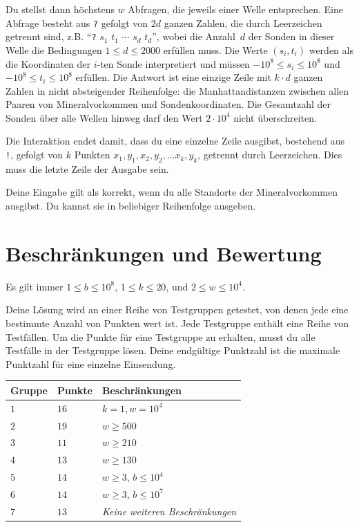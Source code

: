 Du stellst dann höchstens $w$ Abfragen, die jeweils einer Welle entsprechen.
Eine Abfrage besteht aus \texttt{?} gefolgt von $2d$ ganzen Zahlen, die durch Leerzeichen getrennt sind, z.B. ``\texttt{?} $s_1$ $t_1$ $\cdots$ $s_d$ $t_d$'', wobei die Anzahl~$d$ der Sonden in dieser Welle die Bedingungen
$1\leq d\leq 2000$ %
erfüllen muss.
Die Werte $(s_i,t_i)$ werden als die Koordinaten der $i$-ten Sonde interpretiert und müssen
$-10^8 \leq s_i \leq 10^8$ und $-10^8 \leq t_i \leq 10^8$ %
erfüllen.
Die Antwort ist eine einzige Zeile mit $k \cdot d$ ganzen Zahlen in nicht absteigender Reihenfolge: die Manhattandistanzen zwischen allen Paaren von Mineralvorkommen und Sondenkoordinaten.
Die Gesamtzahl der Sonden über alle Wellen hinweg darf den Wert
$2\cdot 10^4$ %
nicht überschreiten.

Die Interaktion endet damit, dass du eine einzelne Zeile ausgibst, bestehend aus \texttt{!}, gefolgt von $k$ Punkten $x_1, y_1, x_2, y_2, \ldots x_k, y_k$, getrennt durch Leerzeichen.
Dies muss die letzte Zeile der Ausgabe sein.

Deine Eingabe gilt als korrekt, wenn du alle Standorte der Mineralvorkommen ausgibst.
Du kannst sie in beliebiger Reihenfolge ausgeben.

\section*{Beschränkungen und Bewertung}

Es gilt immer
$1\leq b \leq 10^8$, %
$1 \leq k \leq 20$, %
und
$2 \le w \le 10^4$. %

Deine Lösung wird an einer Reihe von Testgruppen getestet, von denen jede eine bestimmte Anzahl von Punkten wert ist.
Jede Testgruppe enthält eine Reihe von Testfällen.
Um die Punkte für eine Testgruppe zu erhalten, musst du alle Testfälle in der Testgruppe lösen.
Deine endgültige Punktzahl ist die maximale Punktzahl für eine einzelne Einsendung.

\medskip
\begin{tabular}{lll}
Gruppe & Punkte & Beschränkungen \\\hline
  $1$ & $16$ & $k = 1, w = 10^4$\\
  $2$ & $19$ & $w \ge 500$\\
  $3$ & $11$ & $w \ge 210$\\
  $4$ & $13$ & $w \ge 130$\\
  $5$ & $14$ & $w \ge 3$, $b \le 10^4$\\
  $6$ & $14$ & $w \ge 3$, $b \le 10^7$\\
  $7$ & $13$ & \emph{Keine weiteren Beschränkungen}
\end{tabular}


